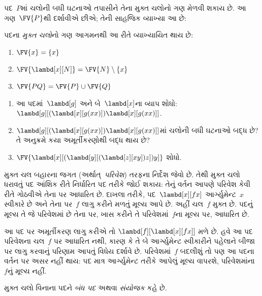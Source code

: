 \documentclass[../../../include/open-logic-section]{subfiles}
\begin{document}
પદ~$P$માં ચલોની બધી ઘટનાઓ તપાસીને તેના મુક્ત ચલોનો ગણ
મેળવી શકાય છે. આ ગણ~$\FV{P}$થી દર્શાવીએ છીએ; તેની સાહજિક
વ્યાખ્યા આ છે:

\begin{defn}[પદના મુક્ત ચલો] 
  પદના \emph{મુક્ત ચલો}નો ગણ આગમનથી આ રીતે વ્યાખ્યાયિત થાય છે:
  \begin{enumerate}
    \item $\FV{x} = \{x\}$ 
    \item $\FV{\lambd[x][N]} = \FV{N} \setminus \{x\}$    
    \item $\FV{PQ} = \FV{P} \cup \FV{Q}$ 
  \end{enumerate}
\end{defn}

\begin{prob}
  \begin{enumerate}
  \item આ પદમાં~$\lambd[g]$ અને બે~$\lambd[x]$ના વ્યાપ શોધો:
    $\lambd[g][(\lambd[x][g (x x)]) \lambd[x][g (x x)]]$.
  \item $\lambd[g][(\lambd[x][g (x x)]) \lambd[x][g (x x)]]$માં
    ચલોની બધી ઘટનાઓ બદ્ધ છે? તે અનુક્રમે કયા અમૂર્તીકરણોથી
    બદ્ધ થાય છે?
    \item $\FV{\lambd[x][(\lambd[y][(\lambd[z][x y]) z]) y]}$
    શોધો.
  \end{enumerate}
\end{prob}

\begin{explain}
મુક્ત ચલ બહારના જગત (અર્થાત્~\emph{પરિવેશ}) તરફના નિર્દેશ જેવો
છે. તેથી મુક્ત ચલો ધરાવતું પદ આંશિક રીતે નિર્ધારિત પદ તરીકે
જોઈ શકાય: તેનું વર્તન આપણે પરિવેશ કેવી રીતે ગોઠવીએ તેના પર
આધારિત છે. દાખલા તરીકે, પદ~$\lambd[x][f x]$ આર્ગ્યુમેન્ટ~$x$
સ્વીકારે છે અને તેના પર~$f$ લાગુ કરીને મળતું મૂલ્ય આપે છે.
અહીં ચલ~$f$ મુક્ત છે. પદનું મૂલ્ય તે જે પરિવેશમાં છે તેના પર,
ખાસ કરીને તે પરિવેશમાં~$f$ના મૂલ્ય પર, આધારિત છે.

આ પદ પર અમૂર્તીકરણ લાગુ કરીએ તો
$\lambd[f][\lambd[x][f
    x]]$ મળે છે. હવે આ પદ પરિવેશના ચલ~$f$ પર આધારિત નથી,
કારણ કે તે બે આર્ગ્યુમેન્ટ સ્વીકારીને પહેલાને બીજા પર લાગુ
કરવાનું પરિણામ આપતું વિધેય દર્શાવે છે. પરિવેશમાં~$f$ બદલીશું
તો પણ આ પદના વર્તન પર અસર નહીં થાય: પદ માત્ર આર્ગ્યુમેન્ટ
તરીકે આપેલું મૂલ્ય વાપરશે, પરિવેશમાંના~$f$નું મૂલ્ય નહીં.
\end{explain}

\begin{defn}[બંધ પદ, સંયોજક]
  મુક્ત ચલો વિનાના પદને \emph{બંધ પદ} અથવા
  \emph{સંયોજક} કહે છે.
\end{defn}
\end{document}
